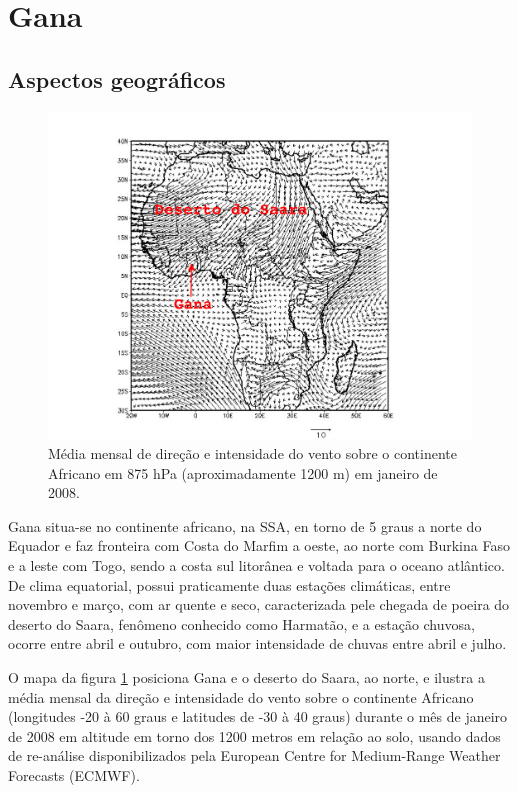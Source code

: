 \newpage
\section{Gana}

\subsection{Aspectos geográficos}

\begin{figure}[H]
  \centering
  \includegraphics[width=\textwidth]{../inputs/grads/gimp/875hPa/JAN_2008.pdf}
  \caption{Média mensal de direção e intensidade do vento sobre o continente 
           Africano em 875 hPa (aproximadamente 1200 m) em janeiro de 2008.
          \label{fg:ECMWFjan2008}}
\end{figure}

Gana situa-se no continente africano, na SSA, en torno de 5 graus a norte 
do Equador e  faz fronteira com Costa do Marfim a oeste, ao norte com Burkina
Faso e a leste com Togo, sendo a costa sul litorânea e voltada para o oceano 
atlântico.
De clima equatorial, possui praticamente duas estações climáticas, 
entre novembro e março, com ar quente e seco, caracterizada pele chegada de
poeira do deserto do Saara, fenômeno conhecido como Harmatão, e a estação 
chuvosa, ocorre entre abril e outubro, com maior intensidade de chuvas 
entre abril e julho. 

O mapa da figura \ref{fg:ECMWFjan2008} posiciona Gana e o deserto do Saara, 
ao norte, e ilustra a média mensal da direção e intensidade do vento 
sobre o continente Africano (longitudes -20 à 60 graus e latitudes de -30 à 40 
graus) durante o mês de janeiro de 2008 em altitude em torno dos 1200 metros 
em relação ao solo, usando dados de re-análise disponibilizados pela 
European Centre for Medium-Range Weather Forecasts (ECMWF). 

